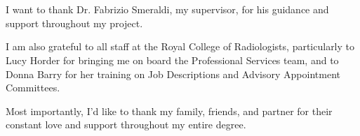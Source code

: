 \section*{}
\vspace{10pt}

I want to thank Dr. Fabrizio Smeraldi, my supervisor, for his guidance and support throughout my project.

I am also grateful to all staff at the Royal College of Radiologists, particularly to Lucy Horder for bringing me on board the Professional Services team, and to Donna Barry for her training on Job Descriptions and Advisory Appointment Committees.

Most importantly, I’d like to thank my family, friends, and partner for their constant love and support throughout my entire degree.